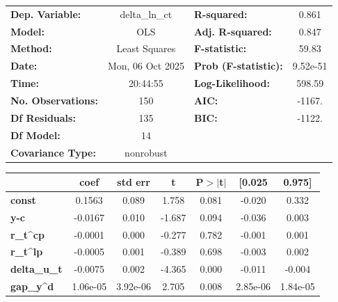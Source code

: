 \begin{center}
\begin{tabular}{lclc}
\toprule
\textbf{Dep. Variable:}    &  delta\_ln\_ct   & \textbf{  R-squared:         } &     0.861   \\
\textbf{Model:}            &       OLS        & \textbf{  Adj. R-squared:    } &     0.847   \\
\textbf{Method:}           &  Least Squares   & \textbf{  F-statistic:       } &     59.83   \\
\textbf{Date:}             & Mon, 06 Oct 2025 & \textbf{  Prob (F-statistic):} &  9.52e-51   \\
\textbf{Time:}             &     20:44:55     & \textbf{  Log-Likelihood:    } &    598.59   \\
\textbf{No. Observations:} &         150      & \textbf{  AIC:               } &    -1167.   \\
\textbf{Df Residuals:}     &         135      & \textbf{  BIC:               } &    -1122.   \\
\textbf{Df Model:}         &          14      & \textbf{                     } &             \\
\textbf{Covariance Type:}  &    nonrobust     & \textbf{                     } &             \\
\bottomrule
\end{tabular}
\begin{tabular}{lcccccc}
                     & \textbf{coef} & \textbf{std err} & \textbf{t} & \textbf{P$> |$t$|$} & \textbf{[0.025} & \textbf{0.975]}  \\
\midrule
\textbf{const}       &       0.1563  &        0.089     &     1.758  &         0.081        &       -0.020    &        0.332     \\
\textbf{y-c}         &      -0.0167  &        0.010     &    -1.687  &         0.094        &       -0.036    &        0.003     \\
\textbf{r\_t^cp}     &      -0.0001  &        0.000     &    -0.277  &         0.782        &       -0.001    &        0.001     \\
\textbf{r\_t^lp}     &      -0.0005  &        0.001     &    -0.389  &         0.698        &       -0.003    &        0.002     \\
\textbf{delta\_u\_t} &      -0.0075  &        0.002     &    -4.365  &         0.000        &       -0.011    &       -0.004     \\
\textbf{gap\_y^d}    &     1.06e-05  &     3.92e-06     &     2.705  &         0.008        &     2.85e-06    &     1.84e-05     \\

\end{tabular}
\end{center}
